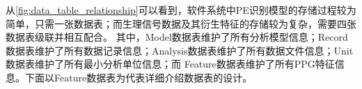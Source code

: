 从\autoref{fig:data_table_relationship}可以看到，软件系统中PE识别模型的存储过程较为简单，只需一张数据表；而生理信号数据及其衍生特征的存储较为复杂，需要四张数据表级联并相互配合。
其中，Model数据表维护了所有分析模型信息；Record数据表维护了所有数据记录信息；Analysis数据表维护了所有数据文件信息；Unit数据表维护了所有最小分析单位信息；而
Feature数据表维护了所有PPG特征信息。下面以Feature数据表为代表详细介绍数据表的设计。


